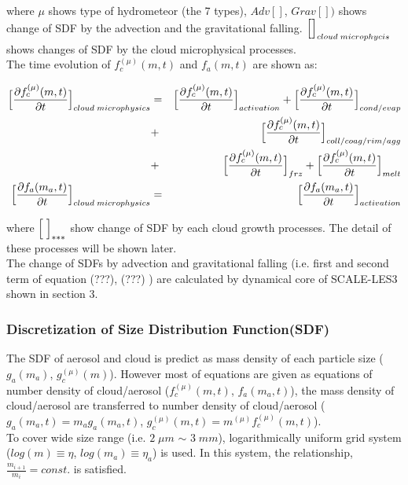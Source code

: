 where $\mu$ shows type of hydrometeor (the 7 types), $Adv[]$, $Grav[])$ shows change of SDF by the advection and the gravitational falling. $\Bigl[ \Bigr]_{cloud\;microphycis}$ shows changes of SDF by the cloud microphysical processes.\\
The time evolution of $f_{c}^{(\mu)}(m,t)$ and $f_{a}(m,t)$ are shown as:

\begin{eqnarray}
\Bigl[ \frac{\partial f_{c}^{(\mu)}(m,t)}{\partial t}\Bigl]_{cloud\;microphysics}&=&\Bigl[\frac{\partial f_{c}^{(\mu)}(m,t)}{\partial t}\Bigr]_{activation}+\Bigl[\frac{\partial f_{c}^{(\mu)}(m,t)}{\partial t}\Bigr]_{cond/evap}\nonumber\\
&+&\Bigl[\frac{\partial f_{c}^{(\mu)}(m,t)}{\partial t}\Bigr]_{coll/coag/rim/agg}\nonumber\\
&+&\Bigl[\frac{\partial f_{c}^{(\mu)}(m,t)}{\partial t}\Bigr]_{frz}+\Bigl[\frac{\partial f_{c}^{(\mu)}(m,t)}{\partial t}\Bigr]_{melt}\nonumber\\
\Bigl[ \frac{\partial f_{a}(m_{a},t)}{\partial t}\Bigl]_{cloud\;microphysics}&=&\Bigl[\frac{\partial f_{a}(m_{a},t)}{\partial t}\Bigr]_{activation}\nonumber
\end{eqnarray}

where $\Bigl[\;\Bigr]_{***}$ show change of SDF by each cloud growth processes. The detail of these processes will be shown later.\\
 The change of SDFs by advection and gravitational falling (i.e. first and second term of equation (???), (???) ) are calculated by dynamical core of SCALE-LES3 shown in section 3.


\subsubsection{Discretization of Size Distribution Function(SDF)}
The SDF of aerosol and cloud is predict as mass density of each particle size ($g_{a}(m_{a})$, $g_{c}^{(\mu)}(m)$). However most of equations are given as equations of number density of cloud/aerosol ($f_{c}^{(\mu)}(m,t)$, $f_{a}(m_{a},t)$), the mass density of cloud/aerosol are transferred to number density of cloud/aerosol ($g_{a}(m_{a},t)=m_{a}g_{a}(m_{a},t)$, $g_{c}^{(\mu)}(m,t)=m^{(\mu)}f_{c}^{(\mu)}(m,t)$).\\
To cover wide size range (i.e. $2\;\mu m$ $\sim$ $3\;mm$), logarithmically uniform grid system ($log(m)\equiv \eta$, $log(m_{a})\equiv \eta_{a}$) is used. In this system, the relationship, $\frac{m_{i+1}}{m_{i}}=const.$ is satisfied. 

